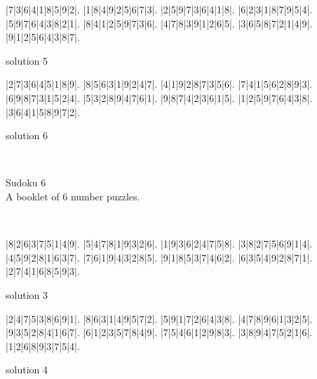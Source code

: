 \documentclass[12pt, letterpaper]{article}
\begin{document}
\thispagestyle{empty}
\begin{multicols}{2}
\vfill
\begin{sudoku}
|7|3|6|4|1|8|5|9|2|.
|1|8|4|9|2|5|6|7|3|.
|2|5|9|7|3|6|4|1|8|.
|6|2|3|1|8|7|9|5|4|.
|5|9|7|6|4|3|8|2|1|.
|8|4|1|2|5|9|7|3|6|.
|4|7|8|3|9|1|2|6|5|.
|3|6|5|8|7|2|1|4|9|.
|9|1|2|5|6|4|3|8|7|.
\end{sudoku}
\begin{center}
    solution 5
\end{center}
\vspace{0.2cm}
\begin{sudoku}
|2|7|3|6|4|5|1|8|9|.
|8|5|6|3|1|9|2|4|7|.
|4|1|9|2|8|7|3|5|6|.
|7|4|1|5|6|2|8|9|3|.
|6|9|8|7|3|1|5|2|4|.
|5|3|2|8|9|4|7|6|1|.
|9|8|7|4|2|3|6|1|5|.
|1|2|5|9|7|6|4|3|8|.
|3|6|4|1|5|8|9|7|2|.
\end{sudoku}
\begin{center}
    solution 6
\end{center}
\columnbreak
\,
\vspace{3cm}
\begin{center}
{\Huge Sudoku 6}\\
\vspace{0.3cm}
A booklet of 6 number puzzles.
\end{center}
\end{multicols}
\newpage

\thispagestyle{empty}
\begin{multicols}{2}
\,
\vfill
\columnbreak
\begin{sudoku}
|8|2|6|3|7|5|1|4|9|.
|5|4|7|8|1|9|3|2|6|.
|1|9|3|6|2|4|7|5|8|.
|3|8|2|7|5|6|9|1|4|.
|4|5|9|2|8|1|6|3|7|.
|7|6|1|9|4|3|2|8|5|.
|9|1|8|5|3|7|4|6|2|.
|6|3|5|4|9|2|8|7|1|.
|2|7|4|1|6|8|5|9|3|.
\end{sudoku}
\begin{center}
    solution 3
\end{center}
\begin{sudoku}
|2|4|7|5|3|8|6|9|1|.
|8|6|3|1|4|9|5|7|2|.
|5|9|1|7|2|6|4|3|8|.
|4|7|8|9|6|1|3|2|5|.
|9|3|5|2|8|4|1|6|7|.
|6|1|2|3|5|7|8|4|9|.
|7|5|4|6|1|2|9|8|3|.
|3|8|9|4|7|5|2|1|6|.
|1|2|6|8|9|3|7|5|4|.
\end{sudoku}
\begin{center}
    solution 4
\end{center}
\end{multicols}
\newpage
\end{document}
